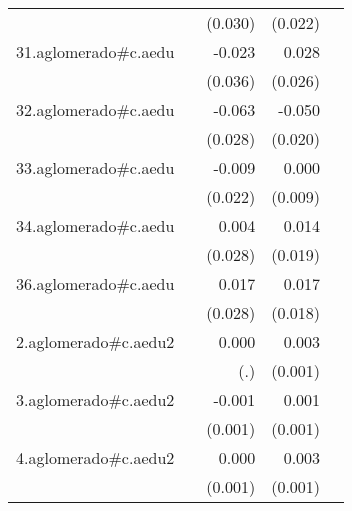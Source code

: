 {\begin{longtable}{l*{4}{D{.}{.}{-1}}}
            &                     &     (0.030)         &     (0.022)         &                     \\
\addlinespace
31.aglomerado#c.aedu&                     &      -0.023         &       0.028         &                     \\
            &                     &     (0.036)         &     (0.026)         &                     \\
\addlinespace
32.aglomerado#c.aedu&                     &      -0.063\sym{*}  &      -0.050\sym{*}  &                     \\
            &                     &     (0.028)         &     (0.020)         &                     \\
\addlinespace
33.aglomerado#c.aedu&                     &      -0.009         &       0.000         &                     \\
            &                     &     (0.022)         &     (0.009)         &                     \\
\addlinespace
34.aglomerado#c.aedu&                     &       0.004         &       0.014         &                     \\
            &                     &     (0.028)         &     (0.019)         &                     \\
\addlinespace
36.aglomerado#c.aedu&                     &       0.017         &       0.017         &                     \\
            &                     &     (0.028)         &     (0.018)         &                     \\
\addlinespace
2.aglomerado#c.aedu2&                     &       0.000         &       0.003\sym{***}&                     \\
            &                     &         (.)         &     (0.001)         &                     \\
\addlinespace
3.aglomerado#c.aedu2&                     &      -0.001         &       0.001         &                     \\
            &                     &     (0.001)         &     (0.001)         &                     \\
\addlinespace
4.aglomerado#c.aedu2&                     &       0.000         &       0.003\sym{***}&                     \\
            &                     &     (0.001)         &     (0.001)         &                     \\

\end{longtable}}
